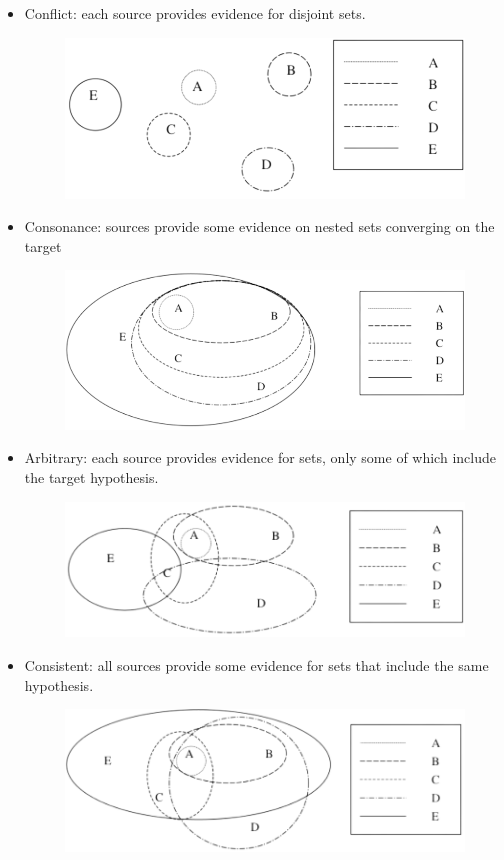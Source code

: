 \documentclass[12pt, a4paper]{report}
\begin{document}
    \begin{itemize}
        \item Conflict: each source provides evidence for disjoint sets. 
            \begin{figure}[H]
                \centering
                \includegraphics[width=0.5\linewidth]{images/conflict.png}
            \end{figure}
        \item Consonance: sources provide some evidence on nested sets converging on the target
            \begin{figure}[H]
                \centering
                \includegraphics[width=0.5\linewidth]{images/consonance.png}
            \end{figure}
        \item Arbitrary: each source provides evidence for sets, only some of which include the target hypothesis. 
            \begin{figure}[H]
                \centering
                \includegraphics[width=0.5\linewidth]{images/arbitrary.png}
            \end{figure}
        \item Consistent: all sources provide some evidence for sets that include the same hypothesis. 
            \begin{figure}[H]
                \centering
                \includegraphics[width=0.5\linewidth]{images/consistent.png}
            \end{figure}
    \end{itemize}
\end{document}
